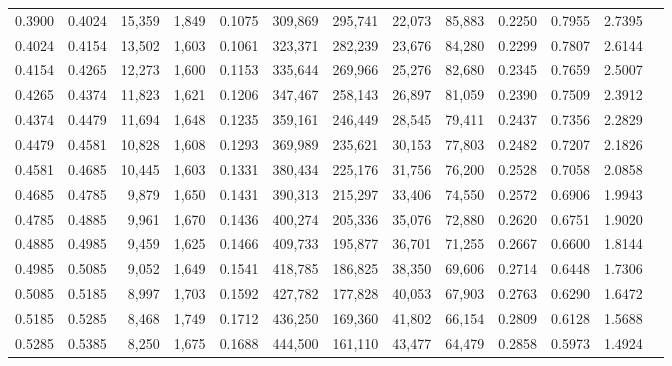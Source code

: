 \begin{tabular}{rrrrrrrrrrrrr}
0.3900 & 0.4024 & 15,359 & 1,849 &                                     0.1075 & 309,869 & 295,741 &  22,073 &  85,883 & 0.2250 & 0.7955 & 2.7395 \\
0.4024 & 0.4154 & 13,502 & 1,603 &                                     0.1061 & 323,371 & 282,239 &  23,676 &  84,280 & 0.2299 & 0.7807 & 2.6144 \\
0.4154 & 0.4265 & 12,273 & 1,600 &                                     0.1153 & 335,644 & 269,966 &  25,276 &  82,680 & 0.2345 & 0.7659 & 2.5007 \\
0.4265 & 0.4374 & 11,823 & 1,621 &                                     0.1206 & 347,467 & 258,143 &  26,897 &  81,059 & 0.2390 & 0.7509 & 2.3912 \\
0.4374 & 0.4479 & 11,694 & 1,648 &                                     0.1235 & 359,161 & 246,449 &  28,545 &  79,411 & 0.2437 & 0.7356 & 2.2829 \\
0.4479 & 0.4581 & 10,828 & 1,608 &                                     0.1293 & 369,989 & 235,621 &  30,153 &  77,803 & 0.2482 & 0.7207 & 2.1826 \\
0.4581 & 0.4685 & 10,445 & 1,603 &                                     0.1331 & 380,434 & 225,176 &  31,756 &  76,200 & 0.2528 & 0.7058 & 2.0858 \\
0.4685 & 0.4785 &  9,879 & 1,650 &                                     0.1431 & 390,313 & 215,297 &  33,406 &  74,550 & 0.2572 & 0.6906 & 1.9943 \\
0.4785 & 0.4885 &  9,961 & 1,670 &                                     0.1436 & 400,274 & 205,336 &  35,076 &  72,880 & 0.2620 & 0.6751 & 1.9020 \\
0.4885 & 0.4985 &  9,459 & 1,625 &                                     0.1466 & 409,733 & 195,877 &  36,701 &  71,255 & 0.2667 & 0.6600 & 1.8144 \\
0.4985 & 0.5085 &  9,052 & 1,649 &                                     0.1541 & 418,785 & 186,825 &  38,350 &  69,606 & 0.2714 & 0.6448 & 1.7306 \\
0.5085 & 0.5185 &  8,997 & 1,703 &                                     0.1592 & 427,782 & 177,828 &  40,053 &  67,903 & 0.2763 & 0.6290 & 1.6472 \\
0.5185 & 0.5285 &  8,468 & 1,749 &                                     0.1712 & 436,250 & 169,360 &  41,802 &  66,154 & 0.2809 & 0.6128 & 1.5688 \\
0.5285 & 0.5385 &  8,250 & 1,675 &                                     0.1688 & 444,500 & 161,110 &  43,477 &  64,479 & 0.2858 & 0.5973 & 1.4924 \\

\end{tabular}
